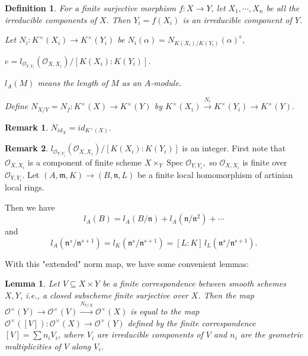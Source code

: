 \documentclass{article}
\theoremstyle{theorem}
\newtheorem*{definition*}{Definition}
\newtheorem{lemma}[theorem]{Lemma}
\theoremstyle{definition}
\newtheorem*{remark*}{Remark}
\begin{document}
    \begin{definition*}
    For a finite surjective morphism $f : X \rightarrow Y$, let $X_1, \cdots, X_n$ be all the irreducible components of $X$. Then $Y_i = f(X_i)$ is an irreducible component of $Y$.
    
    Let $N_i : K^\times(X_i) \rightarrow K^\times(Y_i)$ be $N_i(\alpha) = N_{K(X_i)/K(Y_i)}(\alpha)^e,$
    
    $e = l_{\mathcal O_{Y, Y_i}}(\mathcal O_{X, X_i}) / [K(X_i):K(Y_i)]$.
    
    $l_A(M)$ means the length of $M$ as an $A$-module.
    
    Define $N_{X/Y} = N_f : K^\times(X) \rightarrow K^\times(Y)$ by $K^\times(X_i) \xrightarrow{N_i} K^\times(Y_i) \rightarrow K^\times(Y).$
    \end{definition*}

    \begin{remark*}
        $N_{id_X} = id_{K^\times(X)}.$
    \end{remark*}
    
    \begin{remark*}
        $l_{\mathcal O_{Y, Y_i}}(\mathcal O_{X, X_i}) / [K(X_i):K(Y_i)]$ is an integer. First note that $\mathcal O_{X, X_i}$ is a component of finite scheme $X \times_Y \operatorname{Spec} \mathcal O_{Y, Y_i},$ so $\mathcal O_{X, X_i}$ is finite over $\mathcal O_{Y, Y_i}$. Let $(A, \mathfrak m, K) \rightarrow (B, \mathfrak n, L)$ be a finite local homomorphism of artinian local rings.
        
        Then we have
        $$l_A(B) = l_A(B/\mathfrak n) + l_A(\mathfrak n / \mathfrak n^2) + \cdots$$
        and
        $$l_A(\mathfrak n^s / \mathfrak n^{s+1}) = l_K(\mathfrak n^s / \mathfrak n^{s+1}) = [L:K]\,l_L(\mathfrak n^s / \mathfrak n^{s+1}).$$
    \end{remark*}
    
    With this "extended" norm map, we have some convenient lemmas:
    
    \begin{lemma}
        Let $V \subseteq X \times Y$ be a finite correspondence between smooth schemes $X, Y$, i.e., a closed subscheme finite surjective over $X$. Then the map $\mathcal O^\times(Y) \rightarrow \mathcal O^\times(V) \xrightarrow{N_{V/X}} \mathcal O^\times(X)$ is equal to the map $\mathcal O^\times([V]) : \mathcal O^\times(X) \rightarrow \mathcal O^\times(Y)$ defined by the finite correspondence $[V] = \sum n_iV_i$, where $V_i$ are irreducible components of $V$ and $n_i$ are the geometric multiplicities of $V$ along $V_i$.
    \end{lemma}
    
\end{document}
